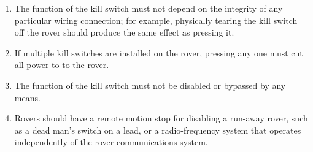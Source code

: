 \begin{enumerate}
\begin{enumerate}
            \item The function of the kill switch must not depend on the integrity of any particular wiring connection; for example, physically tearing the kill switch off the rover should produce the same effect as pressing it.
            \item If multiple kill switches are installed on the rover, pressing any one must cut all power to to the rover.
            \item The function of the kill switch must not be disabled or bypassed by any means.
            \item Rovers should have a remote motion stop for disabling a run-away rover, such as a dead man’s switch on a lead, or a radio-frequency system that operates independently of the rover communications system.
        \end{enumerate}

    \clearpage


\end{enumerate}
